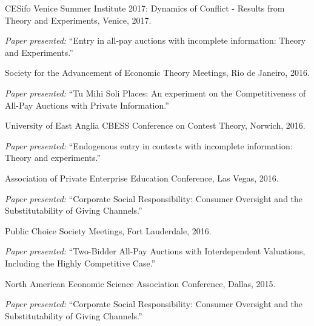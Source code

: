 \documentclass{article}%
\renewenvironment{itemize}{
\begin{list}{}{
\setlength{\leftmargin}{1.5em}
}
}{
\end{list}
}
\begin{document}
\begin{itemize}
\item CESifo Venice Summer Institute 2017: Dynamics of Conflict - Results from Theory and Experiments, Venice, 2017.
\begin{itemize}\vspace{-.24cm}
\item \textit{Paper presented:} ``Entry in all-pay auctions with incomplete information: Theory and Experiments.''
\end{itemize}

\item Society for the Advancement of Economic Theory Meetings, Rio de Janeiro, 2016.
\begin{itemize}\vspace{-.24cm}
\item \textit{Paper presented:} ``Tu Mihi Soli Places: An experiment on the Competitiveness of All-Pay Auctions with Private Information.''
\end{itemize}


\item University of East Anglia CBESS Conference on Contest Theory, Norwich, 2016.
\begin{itemize}\vspace{-.24cm}
\item \textit{Paper presented:} ``Endogenous entry in contests with incomplete information: Theory and experiments.''
\end{itemize}


\item Association of Private Enterprise Education Conference, Las Vegas, 2016.
\begin{itemize}\vspace{-.24cm}
\item \textit{Paper presented:} ``Corporate Social Responsibility: Consumer Oversight and the Substitutability of Giving Channels.''
\end{itemize}


\item Public Choice Society Meetings, Fort Lauderdale, 2016.
\begin{itemize}\vspace{-.24cm}
\item \textit{Paper presented:} ``Two-Bidder All-Pay Auctions with Interdependent Valuations, Including the Highly Competitive Case.''
\end{itemize}


\item North American Economic Science Association Conference, Dallas, 2015.
\begin{itemize}\vspace{-.24cm}
\item \textit{Paper presented:} ``Corporate Social Responsibility: Consumer Oversight and the Substitutability of Giving Channels.''
\end{itemize}


\end{itemize}
\end{document}

